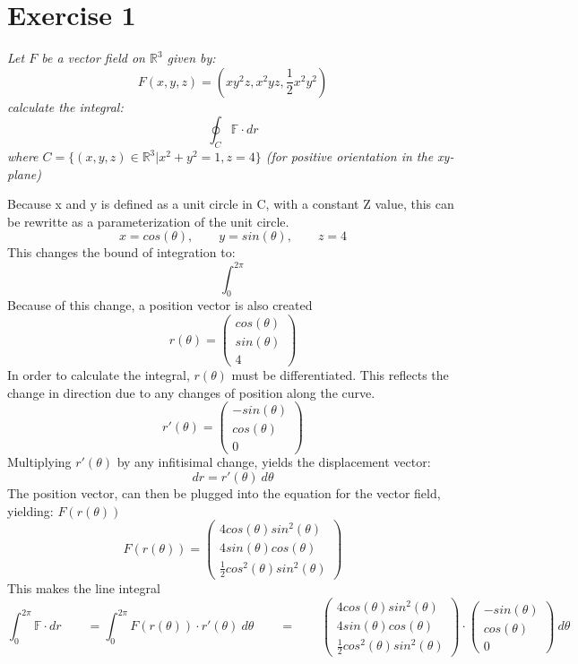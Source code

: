 \section{Exercise 1}
\textit{Let $F$ be a vector field on $\mathbb{R}^3$ given by:}
\[F(x,y,z)=(xy^2z,x^2yz,\frac{1}{2}x^2y^2)\]
\textit{calculate the integral:}
\[\oint_C \mathbb{F} \cdot dr\]
\textit{where $C=\{(x,y,z) \in \mathbb{R}^3 | x^2 + y^2 = 1, z = 4\}$ (for positive orientation in the xy-plane)}


Because x and y is defined as a unit circle in C, with a constant Z value, this can be
rewritte as a parameterization of the unit circle. 
\[x = cos(\theta),
\qquad 
y = sin(\theta),
\qquad z = 4
\]
This changes the bound of integration to:
\[
\int_{0}^{2\pi}\]
Because of this change, a position vector is also created
\[r(\theta) = 
\begin{pmatrix}
cos(\theta) \\ sin(\theta) \\ 4
\end{pmatrix}
\]
In order to calculate the integral, $r(\theta)$ must be differentiated. This reflects the change in direction
due to any changes of position along the curve.
\[r'(\theta) = 
\begin{pmatrix}
-sin(\theta) \\ cos(\theta) \\ 0
\end{pmatrix}\]
Multiplying $r'(\theta)$ by any infitisimal change, yields the displacement vector:
\[dr=r'(\theta) \ d\theta\]
The position vector, can then be plugged into the equation for the vector field, yielding: $F(r(\theta))$
\[
F(r(\theta)) = 
\begin{pmatrix}
    4cos(\theta)sin^2(\theta) \\
    4sin(\theta)cos(\theta) \\
    \frac{1}{2}cos^2(\theta)sin^2(\theta)
\end{pmatrix}
\]
This makes the line integral
\[\int_{0}^{2\pi}\mathbb{F} \cdot dr 
\qquad 
=
\int_{0}^{2\pi} F(r(\theta)) \cdot r'(\theta) \ d\theta
\qquad
=
\qquad
\begin{pmatrix}
    4cos(\theta)sin^2(\theta) \\
    4sin(\theta)cos(\theta) \\
    \frac{1}{2}cos^2(\theta)sin^2(\theta)
\end{pmatrix}
\cdot 
\begin{pmatrix}
-sin(\theta) \\ cos(\theta) \\ 0
\end{pmatrix}
\ d\theta
\]
